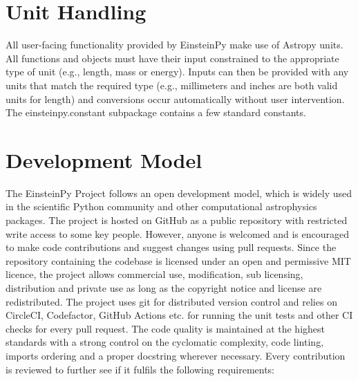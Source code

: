 \documentclass[onecolumn]{aa}
\begin{document}
\section{Unit Handling}

All user-facing functionality provided by EinsteinPy make use of Astropy \citet{astropy:2013} units. All functions and objects must have their input 
constrained to the appropriate type of unit (e.g., length, mass or energy). 
Inputs can then be provided with any units that match the required type 
(e.g., millimeters and inches are both valid units for length) and conversions 
occur automatically without user intervention. The einsteinpy.constant 
subpackage contains a few standard constants.

\section{Development Model}
The EinsteinPy Project follows an open development model, which is widely used in the scientific Python community and other computational astrophysics packages. The project is hosted on GitHub as a public repository with restricted write access to some key people. However, anyone is welcomed and is encouraged to make code contributions and suggest changes using pull requests. Since the repository containing the codebase is licensed under an open and permissive MIT licence,  the project allows commercial use, modification, sub licensing, distribution and private use as long as the copyright notice and license are redistributed. The project uses git for distributed version control and relies on CircleCI, Codefactor, GitHub Actions etc. for running the unit tests and other CI checks for every pull request.
The code quality is maintained at the highest standards with a strong control on the cyclomatic complexity, code linting, imports ordering and a proper docstring wherever necessary. Every contribution is reviewed to further see if it fulfils the following requirements: 
\end{document}
